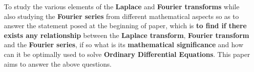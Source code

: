 {To study the various elements of the \textbf{Laplace} and \textbf{Fourier transforms} while also studying the \textbf{Fourier series} from different mathematical aspects so as to answer the statement posed at the beginning of paper, which is \textbf{to find if there exists any relationship} between the \textbf{Laplace transform}, \textbf{Fourier transform} and the \textbf{Fourier series}, if so what is its \textbf{mathematical significance} and how can it be optimally used to solve \textbf{Ordinary Differential Equations}. This paper aims to answer the above questions.}
